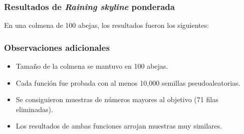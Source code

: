 \begin{frame}
\frametitle{Resultados de \textit{Raining skyline} ponderada}
En una colmena de 100 abejas, los resultados fueron los siguientes:
\begin{figure}
\scalebox{.85}{}
\end{figure}
\end{frame}

\begin{frame}
\frametitle{Observaciones adicionales}
\begin{itemize}
\pause
\item Tamaño de la colmena se mantuvo en 100 abejas.
\pause
\item Cada función fue probada con al menos 10,000 semillas pseudoaleatorias. 
\pause
\item Se consiguieron muestras de números mayores al objetivo (71 filas eliminadas).
\pause 
\item Los resultados de ambas funciones arrojan muestras muy similares.
\begin{figure}
\scalebox{.5}{}
\end{figure}
\end{itemize}
\end{frame}